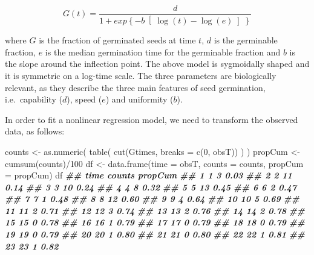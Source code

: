 \documentclass[
]{book}
\newenvironment{Shaded}{\begin{snugshade}}{\end{snugshade}}
\newcommand{\AttributeTok}[1]{\textcolor[rgb]{0.77,0.63,0.00}{#1}}
\newcommand{\DecValTok}[1]{\textcolor[rgb]{0.00,0.00,0.81}{#1}}
\newcommand{\DocumentationTok}[1]{\textcolor[rgb]{0.56,0.35,0.01}{\textbf{\textit{#1}}}}
\newcommand{\FunctionTok}[1]{\textcolor[rgb]{0.00,0.00,0.00}{#1}}
\newcommand{\NormalTok}[1]{#1}
\newcommand{\OtherTok}[1]{\textcolor[rgb]{0.56,0.35,0.01}{#1}}
\newcommand{\SpecialCharTok}[1]{\textcolor[rgb]{0.00,0.00,0.00}{#1}}
\begin{document}
\[
G(t) = \frac{d}{ 1 + exp \left\{ - b \right[ \log(t) - \log(e) \left] \right\}}
\]

where \(G\) is the fraction of germinated seeds at time \(t\), \(d\) is the germinable fraction, \(e\) is the median germination time for the germinable fraction and \(b\) is the slope around the inflection point. The above model is sygmoidally shaped and it is symmetric on a log-time scale. The three parameters are biologically relevant, as they describe the three main features of seed germination, i.e.~capability (\(d\)), speed (\(e\)) and uniformity (\(b\)).

In order to fit a nonlinear regression model, we need to transform the observed data, as follows:

\begin{Shaded}
\begin{Highlighting}[]
\NormalTok{counts }\OtherTok{\textless{}{-}} \FunctionTok{as.numeric}\NormalTok{( }\FunctionTok{table}\NormalTok{( }\FunctionTok{cut}\NormalTok{(Gtimes, }\AttributeTok{breaks =} \FunctionTok{c}\NormalTok{(}\DecValTok{0}\NormalTok{, obsT)) ) )}
\NormalTok{propCum }\OtherTok{\textless{}{-}} \FunctionTok{cumsum}\NormalTok{(counts)}\SpecialCharTok{/}\DecValTok{100}
\NormalTok{df }\OtherTok{\textless{}{-}} \FunctionTok{data.frame}\NormalTok{(}\AttributeTok{time =}\NormalTok{ obsT, }\AttributeTok{counts =}\NormalTok{ counts, }\AttributeTok{propCum =}\NormalTok{ propCum) }
\NormalTok{df}
\DocumentationTok{\#\#    time counts propCum}
\DocumentationTok{\#\# 1     1      3    0.03}
\DocumentationTok{\#\# 2     2     11    0.14}
\DocumentationTok{\#\# 3     3     10    0.24}
\DocumentationTok{\#\# 4     4      8    0.32}
\DocumentationTok{\#\# 5     5     13    0.45}
\DocumentationTok{\#\# 6     6      2    0.47}
\DocumentationTok{\#\# 7     7      1    0.48}
\DocumentationTok{\#\# 8     8     12    0.60}
\DocumentationTok{\#\# 9     9      4    0.64}
\DocumentationTok{\#\# 10   10      5    0.69}
\DocumentationTok{\#\# 11   11      2    0.71}
\DocumentationTok{\#\# 12   12      3    0.74}
\DocumentationTok{\#\# 13   13      2    0.76}
\DocumentationTok{\#\# 14   14      2    0.78}
\DocumentationTok{\#\# 15   15      0    0.78}
\DocumentationTok{\#\# 16   16      1    0.79}
\DocumentationTok{\#\# 17   17      0    0.79}
\DocumentationTok{\#\# 18   18      0    0.79}
\DocumentationTok{\#\# 19   19      0    0.79}
\DocumentationTok{\#\# 20   20      1    0.80}
\DocumentationTok{\#\# 21   21      0    0.80}
\DocumentationTok{\#\# 22   22      1    0.81}
\DocumentationTok{\#\# 23   23      1    0.82}

\end{Highlighting}
\end{Shaded}
\end{document}
